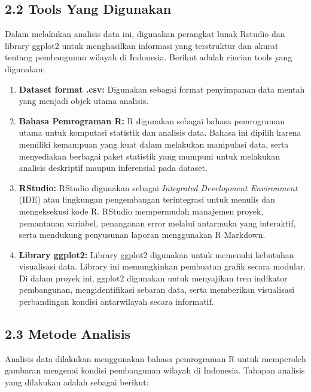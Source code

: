 \documentclass[
  12pt,
]{article}
\providecommand{\tightlist}{%
  \setlength{\itemsep}{0pt}\setlength{\parskip}{0pt}}
\begin{document}
\subsection{\texorpdfstring{\normalsize 2.2 \hspace {0,5cm} Tools Yang
Digunakan}{2.2  Tools Yang Digunakan}}\label{tools-yang-digunakan}

Dalam melakukan analisis data ini, digunakan perangkat lunak Rstudio dan
library ggplot2 untuk menghasilkan informasi yang terstruktur dan akurat
tentang pembangunan wilayah di Indonesia. Berikut adalah rincian tools
yang digunakan:

\begin{enumerate}
\def\labelenumi{\arabic{enumi}.}
\tightlist
\item
  \textbf{Dataset format .csv:} Digunakan sebagai format penyimpanan
  data mentah yang menjadi objek utama analisis.
\item
  \textbf{Bahasa Pemrograman R:} R digunakan sebagai bahasa pemrograman
  utama untuk komputasi statistik dan analisis data. Bahasa ini dipilih
  karena memiliki kemampuan yang kuat dalam melakukan manipulasi data,
  serta menyediakan berbagai paket statistik yang mumpuni untuk
  melakukan analisis deskriptif maupun inferensial pada dataset.
\item
  \textbf{RStudio:} RStudio digunakan sebagai \emph{Integrated
  Development Environment} (IDE) atau lingkungan pengembangan
  terintegrasi untuk menulis dan mengeksekusi kode R. RStudio
  mempermudah manajemen proyek, pemantauan variabel, penanganan error
  melalui antarmuka yang interaktif, serta mendukung penyusunan laporan
  menggunakan R Markdown.
\item
  \textbf{Library ggplot2:} Library ggplot2 digunakan untuk memenuhi
  kebutuhan visualisasi data. Library ini memungkinkan pembuatan grafik
  secara modular. Di dalam proyek ini, ggplot2 digunakan untuk
  menyajikan tren indikator pembangunan, mengidentifikasi sebaran data,
  serta memberikan visualisasi perbandingan kondisi antarwilayah secara
  informatif.
\end{enumerate}

\subsection{\texorpdfstring{\normalsize 2.3 \hspace {0,5cm} Metode
Analisis}{2.3  Metode Analisis}}\label{metode-analisis}

Analisis data dilakukan menggunakan bahasa pemrograman R untuk
memperoleh gambaran mengenai kondisi pembangunan wilayah di Indonesia.
Tahapan analisis yang dilakukan adalah sebagai berikut:
\end{document}
